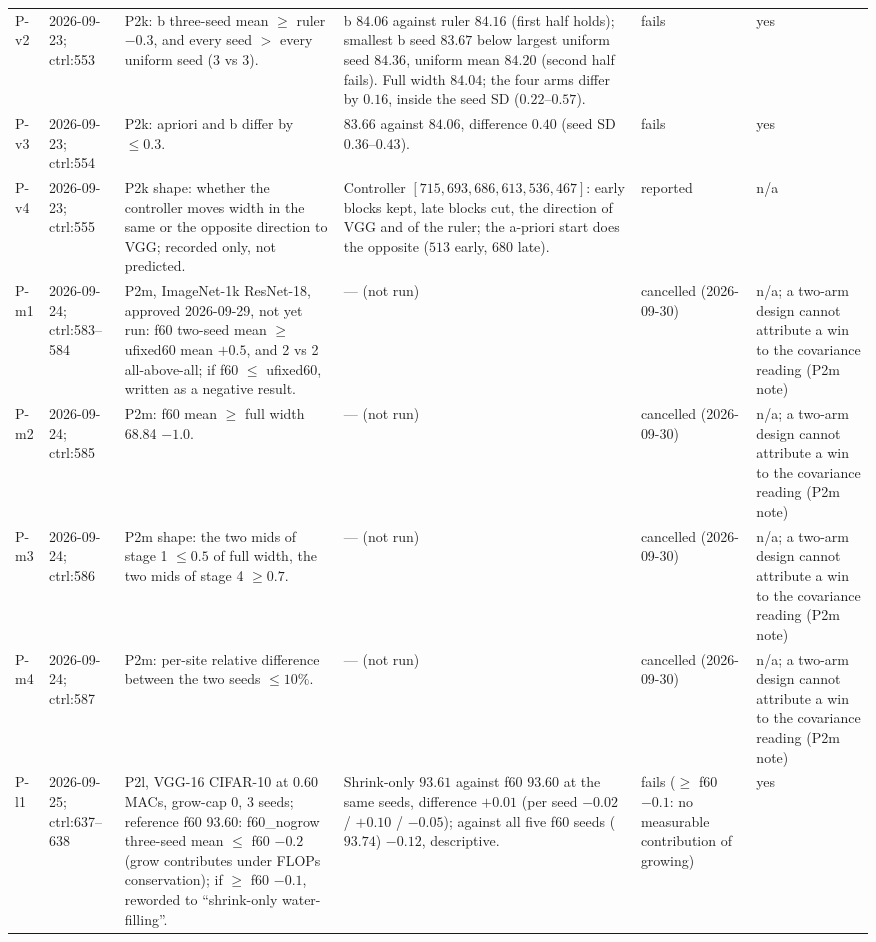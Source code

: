 \begin{longtable}{p{1.1cm}p{1.4cm}p{6.2cm}p{4.6cm}p{2.0cm}p{1.6cm}}
P-v2 & 2026-09-23; ctrl:553 & P2k: b three-seed mean $\ge$ ruler $- 0.3$, and every seed $>$ every uniform seed (3 vs 3). & b $84.06$ against ruler $84.16$ (first half holds); smallest b seed $83.67$ below largest uniform seed $84.36$, uniform mean $84.20$ (second half fails). Full width $84.04$; the four arms differ by $0.16$, inside the seed SD ($0.22$--$0.57$). & fails & yes \\
P-v3 & 2026-09-23; ctrl:554 & P2k: apriori and b differ by $\le 0.3$. & $83.66$ against $84.06$, difference $0.40$ (seed SD $0.36$--$0.43$). & fails & yes \\
P-v4 & 2026-09-23; ctrl:555 & P2k shape: whether the controller moves width in the same or the opposite direction to VGG; recorded only, not predicted. & Controller $[715, 693, 686, 613, 536, 467]$: early blocks kept, late blocks cut, the direction of VGG and of the ruler; the a-priori start does the opposite ($513$ early, $680$ late). & reported & n/a \\
P-m1 & 2026-09-24; ctrl:583--584 & P2m, ImageNet-1k ResNet-18, approved 2026-09-29, not yet run: f60 two-seed mean $\ge$ ufixed60 mean $+ 0.5$, and 2 vs 2 all-above-all; if f60 $\le$ ufixed60, written as a negative result. & --- (not run) & cancelled (2026-09-30) & n/a; a two-arm design cannot attribute a win to the covariance reading (P2m note) \\
P-m2 & 2026-09-24; ctrl:585 & P2m: f60 mean $\ge$ full width 68.84 $- 1.0$. & --- (not run) & cancelled (2026-09-30) & n/a; a two-arm design cannot attribute a win to the covariance reading (P2m note) \\
P-m3 & 2026-09-24; ctrl:586 & P2m shape: the two mids of stage 1 $\le 0.5$ of full width, the two mids of stage 4 $\ge 0.7$. & --- (not run) & cancelled (2026-09-30) & n/a; a two-arm design cannot attribute a win to the covariance reading (P2m note) \\
P-m4 & 2026-09-24; ctrl:587 & P2m: per-site relative difference between the two seeds $\le 10\%$. & --- (not run) & cancelled (2026-09-30) & n/a; a two-arm design cannot attribute a win to the covariance reading (P2m note) \\
P-l1 & 2026-09-25; ctrl:637--638 & P2l, VGG-16 CIFAR-10 at 0.60 MACs, grow-cap 0, 3 seeds; reference f60 93.60: f60\_nogrow three-seed mean $\le$ f60 $- 0.2$ (grow contributes under FLOPs conservation); if $\ge$ f60 $- 0.1$, reworded to ``shrink-only water-filling''. & Shrink-only $93.61$ against f60 $93.60$ at the same seeds, difference $+0.01$ (per seed $-0.02$ / $+0.10$ / $-0.05$); against all five f60 seeds ($93.74$) $-0.12$, descriptive. & fails ($\ge$ f60 $- 0.1$: no measurable contribution of growing) & yes \\

\end{longtable}
